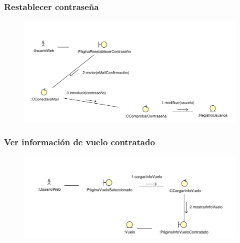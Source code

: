 \documentclass[11pt, a4paper, twoside, titlepage]{article}
\begin{document}
			\subsubsection{Restablecer contraseña}
				\begin{figure}[H]\centering
					\includegraphics[scale=.77]{diagramas/restablecercontrasena.pdf}
				\end{figure}

			\subsubsection{Ver información de vuelo contratado}
				\begin{figure}[H]\centering
					\includegraphics[scale=.8]{diagramas/verinfovuelocontratado.pdf}
				\end{figure}
\end{document}
